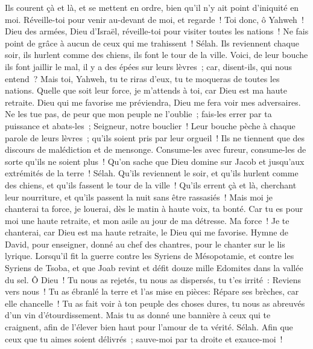 \begin{multicols}{2}
Ils courent çà et là, et se mettent en ordre, bien qu'il n'y ait point d'iniquité en moi. Réveille-toi pour venir au-devant de moi, et regarde~!
Toi donc, ô Yahweh~! Dieu des armées, Dieu d'Israël, réveille-toi pour visiter toutes les nations~! Ne fais point de grâce à aucun de ceux qui me trahissent~! Sélah.
Ils reviennent chaque soir, ils hurlent comme des chiens, ils font le tour de la ville.
Voici, de leur bouche ils font jaillir le mal, il y a des épées sur leurs lèvres~; car, disent-ils, qui nous entend~?
Mais toi, Yahweh, tu te riras d'eux, tu te moqueras de toutes les nations.
Quelle que soit leur force, je m'attends à toi, car Dieu est ma haute retraite.
Dieu qui me favorise me préviendra, Dieu me fera voir mes adversaires.
Ne les tue pas, de peur que mon peuple ne l'oublie~; fais-les errer par ta puissance et abats-les~; Seigneur, notre bouclier~!
Leur bouche pèche à chaque parole de leurs lèvres~; qu'ils soient pris par leur orgueil~! Ils ne tiennent que des discours de malédiction et de mensonge.
Consume-les avec fureur, consume-les de sorte qu'ils ne soient plus~! Qu'on sache que Dieu domine sur Jacob et jusqu'aux extrémités de la terre~! Sélah.
Qu'ils reviennent le soir, et qu'ils hurlent comme des chiens, et qu'ils fassent le tour de la ville~!
Qu'ils errent çà et là, cherchant leur nourriture, et qu'ils passent la nuit sans être rassasiés~!
Mais moi je chanterai ta force, je louerai, dès le matin à haute voix, ta bonté. Car tu es pour moi une haute retraite, et mon asile au jour de ma détresse.
Ma force~! Je te chanterai, car Dieu est ma haute retraite, le Dieu qui me favorise.
\VerseOne{}Hymne de David, pour enseigner, donné au chef des chantres, pour le chanter sur le lis lyrique.
Lorsqu'il fit la guerre contre les Syriens de Mésopotamie, et contre les Syriens de Tsoba, et que Joab revint et défit douze mille Edomites dans la vallée du sel.
Ô Dieu~! Tu nous as rejetés, tu nous as dispersés, tu t'es irrité~: Reviens vers nous~!
Tu as ébranlé la terre et l'as mise en pièces: Répare ses brèches, car elle chancelle~!
Tu as fait voir à ton peuple des choses dures, tu nous as abreuvés d'un vin d'étourdissement.
Mais tu as donné une bannière à ceux qui te craignent, afin de l'élever bien haut pour l'amour de ta vérité. Sélah.
Afin que ceux que tu aimes soient délivrés~; sauve-moi par ta droite et exauce-moi~!

\end{multicols}
